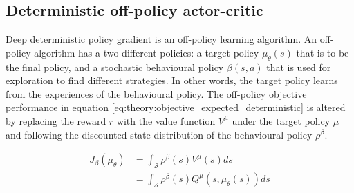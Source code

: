 \documentclass[class=book, crop=false]{standalone}
\begin{document}
\subsection{Deterministic off-policy actor-critic}
Deep deterministic policy gradient is an off-policy learning algorithm. An off-policy algorithm has a two different policies: a target policy $\mu_{\theta}(s)$ that is to be the final policy, and a stochastic behavioural policy $\beta(s,a)$ that is used for exploration to find different strategies. In other words, the target policy learns from the experiences of the behavioural policy. The off-policy objective performance in equation \eqref{eq:theory:objective_expected_deterministic} is altered by replacing the reward $r$ with the value function $V^{\mu}$ under the target policy $\mu$ and following the discounted state distribution of the behavioural policy $\rho^{\beta}$.

\begin{equation}
   \begin{aligned}\label{eq:theory:objective_expected_ooff_policy}
    J_{\beta}(\mu_{\theta}) &=
    \int_{\mathcal{S}}
    \rho^{\beta}(s)V^{\mu}(s) ds 
    \\
    &=
    \int_{\mathcal{S}}
    \rho^{\beta}(s)Q^{\mu}(s,\mu_{\theta}(s)) ds
\end{aligned} 
\end{equation}
\end{document}
